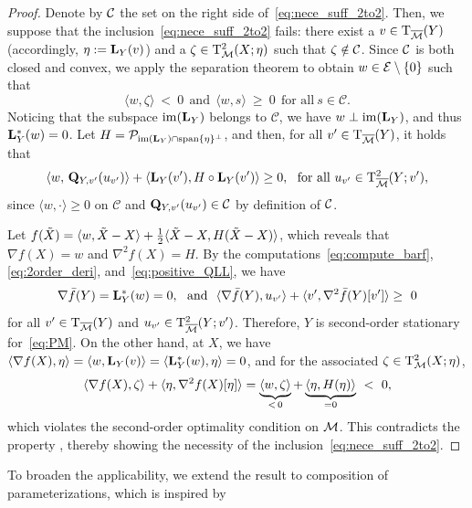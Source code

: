 \begin{proof}
Denote by $\mathcal{C}$ the set on the right side of~\eqref{eq:nece_suff_2to2}. Then, we suppose that the inclusion~\eqref{eq:nece_suff_2to2} fails: there exist a $v\in \mathrm{T}_{\overline{\mathcal{M}}}(Y)$ (accordingly, $\eta:=\mathrm{\bf L}_Y(v)$) and a $\zeta\in \mathrm{T}^2_{\mathcal{M}}(X;\eta)$ such that $\zeta\notin\mathcal{C}$. Since $\mathcal{C}$ is both closed and convex, we apply the separation theorem to obtain $w\in \mathcal{E}\setminus\{0\}$ such that
\[
\langle w,\zeta\rangle\ <\ 0\ \ \text{and}\ \ \langle w,s\rangle\ \ge\ 0\ \  \text{for all}\ s\in \mathcal{C}.
\]
Noticing that the subspace $\operatorname{im}(\mathrm{\bf L}_Y)$ belongs to $\mathcal{C}$, we have $w\perp \operatorname{im}(\mathrm{\bf L}_Y)$, and thus $\mathrm{\bf L}_Y^*(w)=0$. Let $H=\mathcal{P}_{\operatorname{im}(\mathrm{\bf L}_Y)\cap \operatorname{span}\{\eta\}^\perp}$, and then, for all $v^\prime\in \mathrm{T}_{\overline{\mathcal{M}}}(Y)$, it holds that
\begin{equation}\label{eq:positive_QLL}
    \langle w,\,\tanQ_{Y,v^\prime}(u_{v^\prime})\rangle+\langle \tanL_Y (v^\prime),H\circ\tanL_Y (v^\prime)\rangle \ge 0,\ \ \text{for all}\ u_{v^\prime}\in\tangenttwo_{\bmanifold}(Y;v^\prime),
\end{equation}
since $\langle w,\cdot\rangle\ge 0$ on $\mathcal{C}$ and $\mathrm{\bf Q}_{Y,v^\prime}(u_{v^\prime})\in \mathcal{C}$ by definition of $\mathcal{C}$.

Let $f(\tilde{X})=\langle w,\tilde{X}-X\rangle+\tfrac12\langle {\tilde{X}-X, H(\tilde{X}-X)} \rangle$, which reveals that $\nabla f(X)=w$ and $\nabla^2 f(X)=H$. By the computations~\eqref{eq:compute_barf}, \eqref{eq:2order_deri}, and~\eqref{eq:positive_QLL}, we have
\[
\nabla\bar f(Y)=\tanL_Y^*(w)=0,\ \ \text{and}\ \ \innerp{\nabla \bar{f}(Y),u_{v^\prime}}+\innerp{v^\prime,\nabla^2 \bar{f}(Y)[v^\prime]}\ge\ 0
\]
for all $v'\in \mathrm{T}_{\overline{\mathcal{M}}}(Y)$ and $u_{v^\prime}\in\mathrm{T}^2_{\overline{\mathcal{M}}}(Y;v^\prime)$. Therefore, $Y$ is second-order stationary for~\eqref{eq:PM}. On the other hand, at $X$, we have $\langle \nabla f(X),\eta\rangle=\langle w,\mathrm{\bf L}_Y(v)\rangle=\langle {\mathrm{\bf L}_Y^*(w),\eta} \rangle=0$, and for the associated $\zeta\in\mathrm{T}^2_{\mathcal{M}}(X;\eta)$,
\[
\langle \nabla f(X),\zeta\rangle + \innerp{\eta, \nabla^2 f(X)[\eta]}
= \underbrace{\langle w,\zeta \rangle}_{<\,0}+\underbrace{\innerp{\eta,H(\eta)}}_{=0}\ <\ 0,
\]
which violates the second-order optimality condition on $\mathcal{M}$. This contradicts the property \twototwo, thereby showing the necessity of the inclusion~\eqref{eq:nece_suff_2to2}.
\end{proof}

To broaden the applicability, we extend the result to composition of parameterizations, which is inspired by~\cite[\S 3.3]{levin2025effect}

